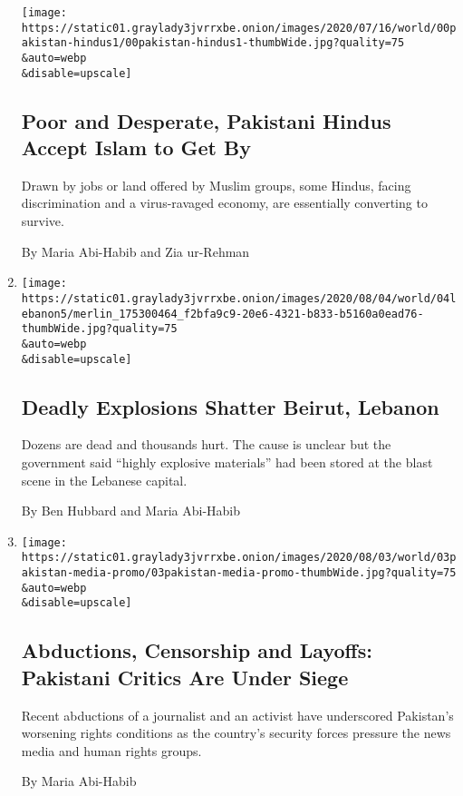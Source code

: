 \begin{enumerate}
  \texttt{[image: https://static01.graylady3jvrrxbe.onion/images/2020/07/16/world/00pakistan-hindus1/00pakistan-hindus1-thumbWide.jpg?quality=75\\\&auto=webp\\\&disable=upscale]}

  \hypertarget{poor-and-desperate-pakistani-hindus-accept-islam-to-get-by}{%
  \subsection{Poor and Desperate, Pakistani Hindus Accept Islam to Get
  By}\label{poor-and-desperate-pakistani-hindus-accept-islam-to-get-by}}

  Drawn by jobs or land offered by Muslim groups, some Hindus, facing
  discrimination and a virus-ravaged economy, are essentially converting
  to survive.

  By Maria Abi-Habib and Zia ur-Rehman
\item
  \href{/2020/08/04/world/middleeast/beirut-explosion-blast.html}{}

  \texttt{[image: https://static01.graylady3jvrrxbe.onion/images/2020/08/04/world/04lebanon5/merlin\_175300464\_f2bfa9c9-20e6-4321-b833-b5160a0ead76-thumbWide.jpg?quality=75\\\&auto=webp\\\&disable=upscale]}

  \hypertarget{deadly-explosions-shatter-beirut-lebanon}{%
  \subsection{Deadly Explosions Shatter Beirut,
  Lebanon}\label{deadly-explosions-shatter-beirut-lebanon}}

  Dozens are dead and thousands hurt. The cause is unclear but the
  government said ``highly explosive materials'' had been stored at the
  blast scene in the Lebanese capital.

  By Ben Hubbard and Maria Abi-Habib
\item
  \href{/2020/08/03/world/asia/pakistan-media-abductions.html}{}

  \texttt{[image: https://static01.graylady3jvrrxbe.onion/images/2020/08/03/world/03pakistan-media-promo/03pakistan-media-promo-thumbWide.jpg?quality=75\\\&auto=webp\\\&disable=upscale]}

  \hypertarget{abductions-censorship-and-layoffs-pakistani-critics-are-under-siege}{%
  \subsection{Abductions, Censorship and Layoffs: Pakistani Critics Are
  Under
  Siege}\label{abductions-censorship-and-layoffs-pakistani-critics-are-under-siege}}

  Recent abductions of a journalist and an activist have underscored
  Pakistan's worsening rights conditions as the country's security
  forces pressure the news media and human rights groups.

  By Maria Abi-Habib
\end{enumerate}

